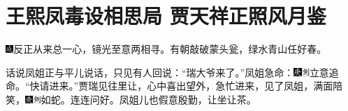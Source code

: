

\chapter{王熙凤毒设相思局 贾天祥正照风月鉴}

{\includegraphics[width=3mm]{../Images/00005}反正从来总一心，镜光至意两相寻。有朝敲破蒙头瓮，绿水青山任好春。}

话说凤姐正与平儿说话，只见有人回说：``瑞大爷来了。''凤姐急命：{\includegraphics[width=3mm]{../Images/00004}\includegraphics[width=3mm]{../Images/00011}\footnotesize \kaishu 立意追命。}``快请进来。''贾瑞见往里让，心中喜出望外，急忙进来，见了凤姐，满面陪笑，{\includegraphics[width=3mm]{../Images/00004}\includegraphics[width=3mm]{../Images/00011}\footnotesize \kaishu 如蛇。}连连问好。凤姐儿也假意殷勤，让坐让茶。

